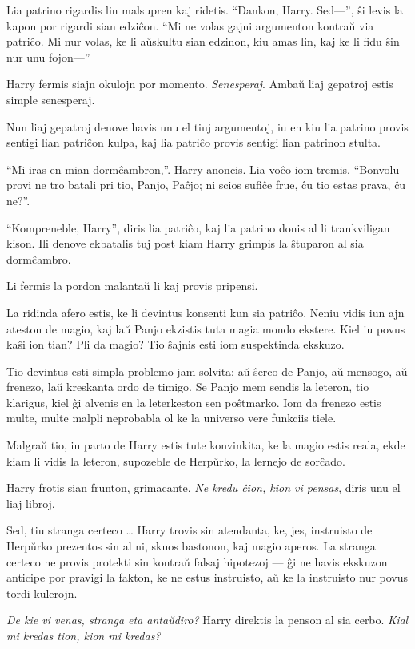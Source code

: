 Lia patrino rigardis lin malsupren kaj ridetis. ``Dankon, Harry. Sed—'', ŝi
levis la kapon por rigardi sian edziĉon. ``Mi ne volas gajni argumenton kontraŭ
via patriĉo. Mi nur volas, ke li aŭskultu sian edzinon, kiu amas lin, kaj ke li
fidu ŝin nur unu fojon—''

Harry fermis siajn okulojn por momento. \emph{Senesperaj}. Ambaŭ liaj gepatroj
estis simple senesperaj.

Nun liaj gepatroj denove havis unu el tiuj argumentoj, iu en kiu lia patrino
provis sentigi lian patriĉon kulpa, kaj lia patriĉo provis sentigi lian patrinon
stulta.

``Mi iras en mian dormĉambron,''. Harry anoncis. Lia voĉo iom tremis. ``Bonvolu
provi ne tro batali pri tio, Panjo, Paĉjo; ni scios sufiĉe frue, ĉu tio estas
prava, ĉu ne?''.

``Kompreneble, Harry'', diris lia patriĉo, kaj lia patrino donis al li
trankviligan kison. Ili denove ekbatalis tuj post kiam Harry grimpis la ŝtuparon
al sia dormĉambro.

Li fermis la pordon malantaŭ li kaj provis pripensi.

La ridinda afero estis, ke li devintus konsenti kun sia patriĉo. Neniu vidis iun
ajn ateston de magio, kaj laŭ Panjo ekzistis tuta magia mondo ekstere. Kiel iu
povus kaŝi ion tian? Pli da magio? Tio ŝajnis esti iom suspektinda ekskuzo.

Tio devintus esti simpla problemo jam solvita: aŭ ŝerco de Panjo, aŭ mensogo, aŭ
frenezo, laŭ kreskanta ordo de timigo. Se Panjo mem sendis la leteron, tio
klarigus, kiel ĝi alvenis en la leterkeston sen poŝtmarko. Iom da frenezo estis
multe, multe malpli neprobabla ol ke la universo vere funkciis tiele.

Malgraŭ tio, iu parto de Harry estis tute konvinkita, ke la magio estis reala,
ekde kiam li vidis la leteron, supozeble de Herpŭrko, la lernejo de sorĉado.

Harry frotis sian frunton, grimacante. \emph{Ne kredu ĉion, kion vi pensas},
diris unu el liaj libroj.

Sed, tiu stranga certeco \ldots{} Harry trovis sin atendanta, ke, jes,
instruisto de Herpŭrko prezentos sin al ni, skuos bastonon, kaj magio aperos. La
stranga certeco ne provis protekti sin kontraŭ falsaj hipotezoj — ĝi ne havis
ekskuzon anticipe por pravigi la fakton, ke ne estus instruisto, aŭ ke la
instruisto nur povus tordi kulerojn.

\emph{De kie vi venas, stranga eta antaŭdiro?} Harry direktis la penson al sia
cerbo. \emph{Kial mi kredas tion, kion mi kredas?}

